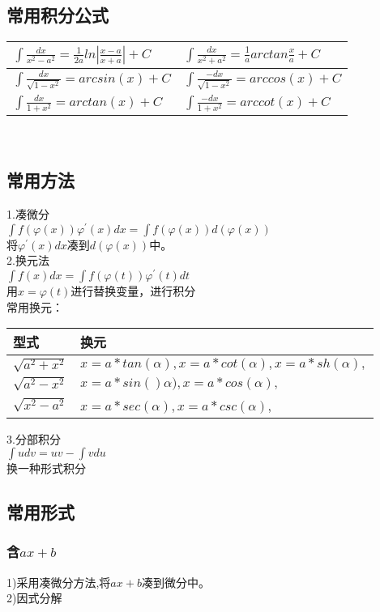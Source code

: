 \documentclass[fleqn]{article}
\begin{document}
\begin{flushleft}
	\subsection{常用积分公式}
		\begin{tabular}{|l|l|}
			\hline
			$\int \frac{dx}{x^2-a^2}=\frac{1}{2a}ln|\frac{x-a}{x+a}|+C$ & $\int \frac{dx}{x^2+a^2}=\frac{1}{a}arctan\frac{x}{a}+C$\\
			\hline
		$\int \frac{dx}{\sqrt{1-x^2}}=arcsin(x)+C$ & $\int \frac{-dx}{\sqrt{1-x^2}}=arccos(x)+C$\\
			\hline
		 $\int \frac{dx}{1+x^2}=arctan(x)+C$ & $\int \frac{-dx}{1+x^2}=arccot(x)+C$\\
		\hline
		\end{tabular}\\


	\subsection{常用方法}
		1.凑微分\\
		$\int f(\varphi(x))\varphi^{'}(x)dx=\int f(\varphi(x))d(\varphi(x))$\\
		将$\varphi^{'}(x)dx$凑到$d(\varphi(x))$中。\\
		2.换元法\\
		$\int f(x)dx=\int f(\varphi(t))\varphi^{'}(t)dt$\\
		用$x=\varphi(t)$进行替换变量，进行积分\\
		常用换元：\\
		\begin{tabular}{|l|l|}
\hline
			型式 & 换元\\
\hline
			$\sqrt{a^2+x^2}$ & $x=a*tan(\alpha),x=a*cot(\alpha),x=a*sh(\alpha),$\\
			$\sqrt{a^2-x^2}$ & $x=a*sin()\alpha),x=a*cos(\alpha),$\\
			$\sqrt{x^2-a^2}$ & $x=a*sec(\alpha),x=a*csc(\alpha)$,\\
\hline
		\end{tabular}

		3.分部积分\\
		$\int udv=uv-\int vdu$\\
		换一种形式积分
	\subsection{常用形式}
		\subsubsection{含$ax+b$}
		1)采用凑微分方法,将$ax+b$凑到微分中。\\
		2)因式分解\\

\end{flushleft}
\end{document}
